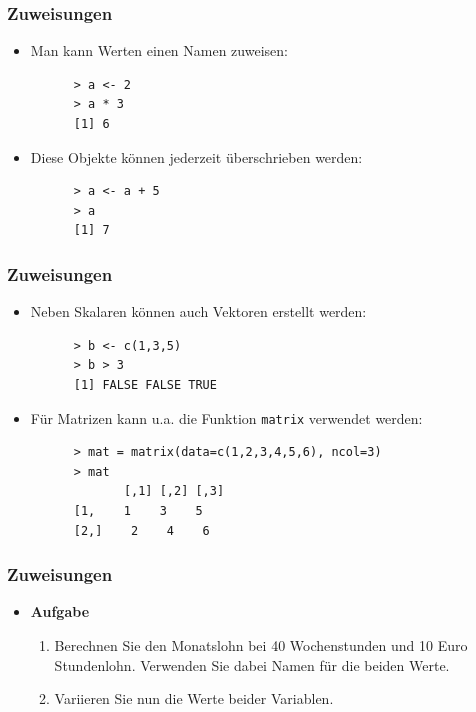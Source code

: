 \documentclass{beamer}
\begin{document}
\begin{frame}[fragile]
  \frametitle{Zuweisungen}
  \begin{itemize}
    \item Man kann Werten einen Namen zuweisen:
    \begin{Verbatim}
      > a <- 2
      > a * 3
      [1] 6
    \end{Verbatim}
   \item Diese Objekte können jederzeit überschrieben werden:
    \begin{Verbatim}
      > a <- a + 5
      > a
      [1] 7
    \end{Verbatim}
  \end{itemize}
\end{frame}

\begin{frame}[fragile]
  \frametitle{Zuweisungen}
  \begin{itemize} 
  \item Neben Skalaren können auch Vektoren erstellt werden:
    \begin{Verbatim}
      > b <- c(1,3,5)
      > b > 3
      [1] FALSE FALSE TRUE
    \end{Verbatim}
   \item Für Matrizen kann u.a. die Funktion \Verb+matrix+ verwendet werden:
    \begin{Verbatim}
      > mat = matrix(data=c(1,2,3,4,5,6), ncol=3)
      > mat
             [,1] [,2] [,3]
      [1,    1    3    5
      [2,]	  2    4    6
    \end{Verbatim}
  \end{itemize}
\end{frame}

\begin{frame}[fragile]
  \frametitle{Zuweisungen}
  \begin{itemize}
    \item \textbf{Aufgabe} \\ 
         \begin{enumerate}
      		\item Berechnen Sie den Monatslohn bei 40 Wochenstunden und 10 Euro Stundenlohn. Verwenden Sie dabei Namen für die beiden Werte.
      		\item Variieren Sie nun die Werte beider Variablen.
    \end{enumerate}
  \end{itemize}
\end{frame}
\end{document}

